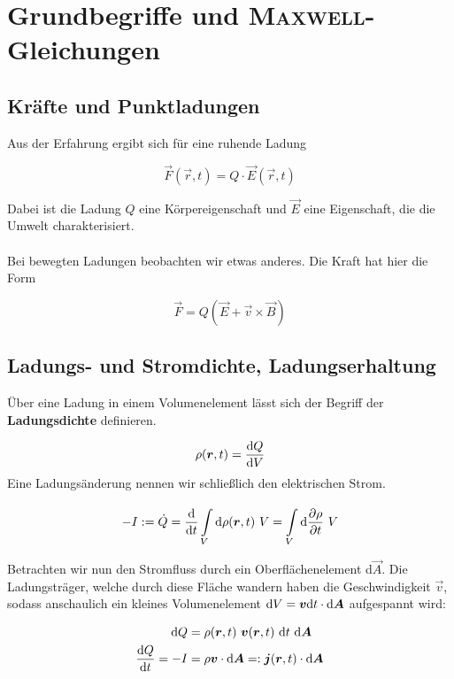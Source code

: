 \chapter{Grundbegriffe und \textsc{Maxwell}-Gleichungen}
\section{Kräfte und Punktladungen}

Aus der Erfahrung ergibt sich für eine ruhende Ladung

\begin{equation*}
\vec{F}(\vec{r},t)=Q\cdot\vec{E}(\vec{r},t)
\end{equation*}

Dabei ist die Ladung $Q$ eine Körpereigenschaft und $\vec{E}$ eine Eigenschaft, die die Umwelt charakterisiert.\\
\ \\
Bei bewegten Ladungen beobachten wir etwas anderes. Die Kraft hat hier die Form

\begin{equation*}
\vec{F}=Q(\vec{E}+\vec{v}\times\vec{B})
\end{equation*}
\linebreak

\section{Ladungs- und Stromdichte, Ladungserhaltung}

Über eine Ladung in einem Volumenelement lässt sich der Begriff der \textbf{Ladungsdichte} definieren.

\begin{equation*}
\rho(\bm{r},t)=\frac{\mathrm{d}{Q}}{\mathrm{d}{V}}
\end{equation*}
\newpage
Eine Ladungsänderung nennen wir schließlich den elektrischen Strom.

\begin{equation*}
-I:=\dot{Q}=\frac{\mathrm{d}{}}{\mathrm{d}{t}}\int\limits_{{V}}^{{}}\mathrm{d}{\rho(\bm{r},t)}\ {V}=\int\limits_{{V}}^{{}}\mathrm{d}{\frac{\partial{\rho}}{\partial{t}}}\ {V}
\end{equation*}

Betrachten wir nun den Stromfluss durch ein Oberflächenelement d$\vec{A}$. Die Ladungsträger, welche durch diese Fläche wandern haben die Geschwindigkeit $\vec{v}$, sodass anschaulich ein kleines Volumenelement $\mathrm{d} V = \bm{v}\mathrm{d}t\cdot\mathrm{d}\bm{A}$ aufgespannt wird:

\begin{align*}
\mathrm{d}Q &= \rho(\vec{r},t) \ \vec{v}(\vec{r},t) \ \mathrm{d}t \ \mathrm{d}\vec{A}\\
\diff{Q}{t} =-I &= \rho\vec{v}\cdot\mathrm{d}\vec{A}=:\vec{j}(\vec{r},t)\cdot\mathrm{d}\vec{A}
\end{align*}

